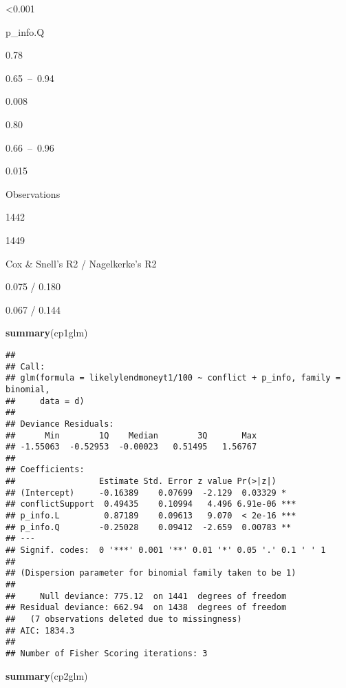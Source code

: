 \documentclass[]{article}
\newenvironment{Shaded}{\begin{snugshade}}{\end{snugshade}}
\newcommand{\KeywordTok}[1]{\textcolor[rgb]{0.13,0.29,0.53}{\textbf{{#1}}}}
\newcommand{\NormalTok}[1]{{#1}}
\begin{document}
\textless{}0.001

p\_info.Q

0.78

0.65~--~0.94

0.008

0.80

0.66~--~0.96

0.015

Observations

1442

1449

Cox \& Snell's R2 / Nagelkerke's R2

0.075 / 0.180

0.067 / 0.144

\begin{Shaded}
\begin{Highlighting}[]
\KeywordTok{summary}\NormalTok{(cp1glm)}
\end{Highlighting}
\end{Shaded}

\begin{verbatim}
## 
## Call:
## glm(formula = likelylendmoneyt1/100 ~ conflict + p_info, family = binomial, 
##     data = d)
## 
## Deviance Residuals: 
##      Min        1Q    Median        3Q       Max  
## -1.55063  -0.52953  -0.00023   0.51495   1.56767  
## 
## Coefficients:
##                 Estimate Std. Error z value Pr(>|z|)    
## (Intercept)     -0.16389    0.07699  -2.129  0.03329 *  
## conflictSupport  0.49435    0.10994   4.496 6.91e-06 ***
## p_info.L         0.87189    0.09613   9.070  < 2e-16 ***
## p_info.Q        -0.25028    0.09412  -2.659  0.00783 ** 
## ---
## Signif. codes:  0 '***' 0.001 '**' 0.01 '*' 0.05 '.' 0.1 ' ' 1
## 
## (Dispersion parameter for binomial family taken to be 1)
## 
##     Null deviance: 775.12  on 1441  degrees of freedom
## Residual deviance: 662.94  on 1438  degrees of freedom
##   (7 observations deleted due to missingness)
## AIC: 1834.3
## 
## Number of Fisher Scoring iterations: 3
\end{verbatim}

\begin{Shaded}
\begin{Highlighting}[]
\KeywordTok{summary}\NormalTok{(cp2glm)}
\end{Highlighting}
\end{Shaded}
\end{document}
